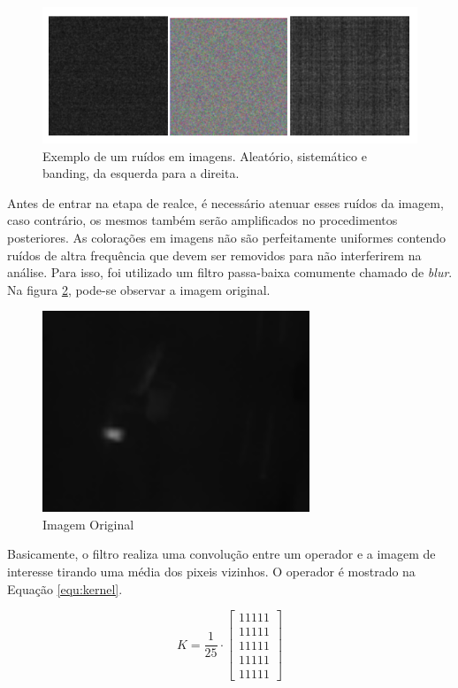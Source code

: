 		\begin{figure}[!ht]
		   \centering
		   \includegraphics[width=14cm]{Figures/noise.png}
		   \caption{Exemplo de um ruídos em imagens. Aleatório, sistemático e banding, da esquerda para a direita.}
		   \label{fig:noise}
		\end{figure}


		
		Antes de entrar na etapa de realce, é necessário atenuar esses ruídos da imagem, caso contrário, os mesmos também serão amplificados no procedimentos posteriores. As colorações em imagens não são perfeitamente uniformes contendo ruídos de altra frequência que devem ser removidos para não interferirem na análise. Para isso, foi utilizado um filtro passa-baixa comumente chamado de \textit{blur}. Na figura \ref{fig:img_80graus}, pode-se observar a imagem original.
			
		\begin{figure}[!ht]
		   \centering
		   \includegraphics[width=8cm]{Figures/flirphoto.png}
		   \caption{Imagem Original}
		   \label{fig:img_80graus}
		\end{figure}
		
		Basicamente, o filtro realiza uma convolução entre um operador e a imagem de interesse tirando uma média dos pixeis vizinhos. O operador é mostrado na Equação \ref{equ:kernel}.
		
		\begin{equation}
			K = \frac{1}{25}\cdot \begin{bmatrix}
			 1  1  1  1  1\\ 
			 1  1  1  1  1\\ 
			 1  1  1  1  1\\ 
			 1  1  1  1  1\\ 
			 1  1  1  1  1 
			\end{bmatrix}
			\label{equ:kernel}
		\end{equation}
		
